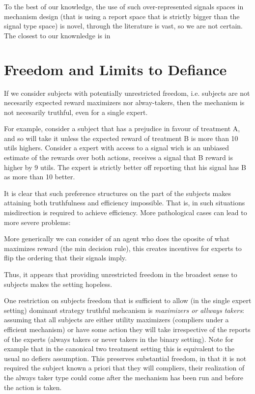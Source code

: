 To the best of our knowledge, the use of such over-represented signals spaces in mechanism design (that is using a report space that is strictly bigger than the signal type space) is novel, through the literature is vast, so we are not certain. The closest to our knownledge is in 

	


\section{Freedom and Limits to Defiance}

If we consider subjects with potentially unrestricted freedom, i.e. subjects are not necesarily expected reward maximizers nor alway-takers, then the mechanism is not necesarily truthful, even for a single expert. 

\begin{eg}
	For example, consider a subject that has a prejudice in favour of treatment A, and so will take it unless the expected reward of treatment B is more than 10 utils highers. Consider a expert with access to a signal wich is an unbiased estimate of the rewards over both actions, receives a signal  that B reward is higher by 9 utils. The expert is strictly better off reporting that his signal has B as more than 10 better.
\end{eg}

It is clear that such preference structures on the part of the subjects makes attaining both truthfulness and efficiency impossible. That is, in such situations misdirection is required to achieve efficiency. More pathological cases can lead to more severe problems:

\begin{eg}
	More generically we can consider of an agent who does the oposite of what maximizes reward (the min decision rule), this creates incentives for experts to flip the ordering that their signals imply. 
\end{eg}

Thus, it appears that providing unrestricted freedom in the broadest sense to subjects makes the setting hopeless. 

One restriction on subjects freedom that is sufficient to allow (in the single expert setting) dominant strategy truthful mehcanism is \emph{maximizers or allways takers}: assuming that all subjects are either utility maximizers (compliers under a efficient mechanism) or have some action they will take irrespective of the reports of the experts (always takers or never takers in the binary setting). Note for example that in the canonical two treatment setting this is equivalent to the usual no defiers assumption. 
This preserves substantial freedom, in that it is not required the subject known a priori that they will compliers, their realization of the always taker type could come after the mechanism has been run and before the action is taken. 

